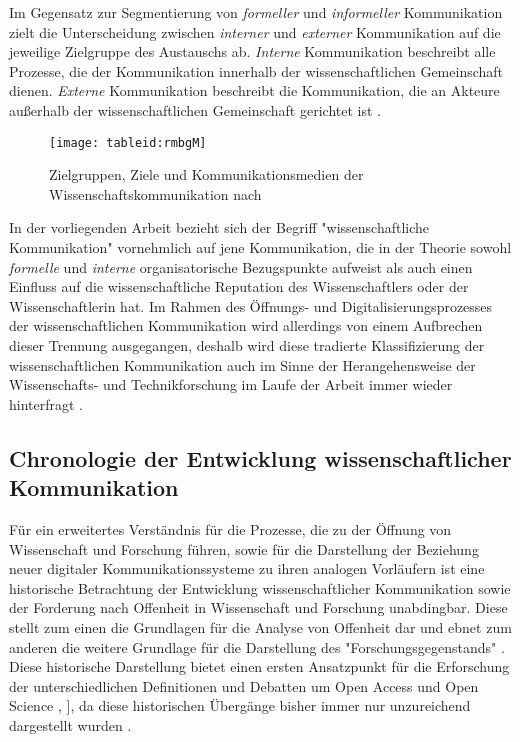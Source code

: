 Im Gegensatz zur Segmentierung von \textit{formeller} und \textit{informeller} Kommunikation zielt die Unterscheidung zwischen \textit{interner} und \textit{externer} Kommunikation auf die jeweilige Zielgruppe des Austauschs ab. \textit{Interne} Kommunikation beschreibt alle Prozesse, die der Kommunikation innerhalb der wissenschaftlichen Gemeinschaft dienen. \textit{Externe} Kommunikation beschreibt die Kommunikation, die an Akteure außerhalb der wissenschaftlichen Gemeinschaft gerichtet ist \cite{Konneker_2013}.

\begin{figure}[h!]
\texttt{[image: tableid:rmbgM]}
\caption{Zielgruppen, Ziele und Kommunikationsmedien der Wissenschaftskommunikation nach  \cite{Seidenfaden_2005}}
\end{figure}

In der vorliegenden Arbeit bezieht sich der Begriff "wissenschaftliche Kommunikation" vornehmlich auf jene Kommunikation, die in der Theorie sowohl \textit{formelle} und \textit{interne} organisatorische Bezugspunkte aufweist als auch einen Einfluss auf die wissenschaftliche Reputation des Wissenschaftlers oder der Wissenschaftlerin hat. Im Rahmen des Öffnungs- und Digitalisierungsprozesses der wissenschaftlichen Kommunikation wird allerdings von einem Aufbrechen dieser Trennung ausgegangen, deshalb wird diese tradierte Klassifizierung der wissenschaftlichen Kommunikation auch im Sinne der Herangehensweise der Wissenschafts- und Technikforschung im Laufe der Arbeit immer wieder hinterfragt  \cite[:326]{Bowker_2000}.

\subsection{Chronologie der Entwicklung wissenschaftlicher Kommunikation}

Für ein erweitertes Verständnis für die Prozesse, die zu der Öffnung von Wissenschaft und Forschung führen, sowie für die Darstellung der Beziehung neuer digitaler Kommunikationssysteme zu ihren analogen Vorläufern ist eine historische Betrachtung der Entwicklung wissenschaftlicher Kommunikation sowie der Forderung nach Offenheit in Wissenschaft und Forschung unabdingbar. Diese stellt zum einen die Grundlagen für die Analyse von Offenheit dar und ebnet zum anderen die weitere Grundlage für die Darstellung des "Forschungsgegenstands" \cite{Bierschenk_2014}. Diese historische Darstellung bietet einen ersten Ansatzpunkt für die Erforschung der unterschiedlichen Definitionen und Debatten um Open Access und Open Science \cite{Scheliga_2014}, ], da diese historischen Übergänge bisher immer nur unzureichend dargestellt wurden \cite{CREATe_2014}.

